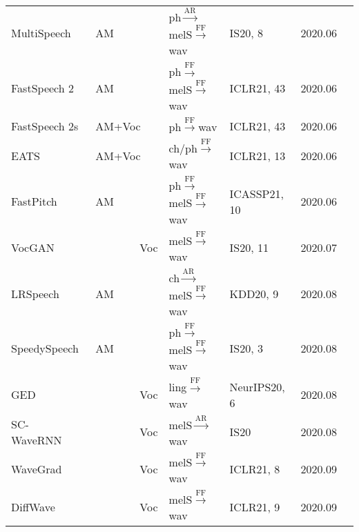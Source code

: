 \documentclass{article}
\begin{document}
\begin{center}
\begin{longtable}{l | l | l | l | l | l }
		MultiSpeech~\cite{chen2020multispeech}         & AM & {\color{blue}ph}$\stackrel{\text{AR}}{\longrightarrow}${\color{red}melS}$\stackrel{\text{FF}}{\longrightarrow}$wav              & IS20, 8 & 2020.06        \\
		FastSpeech 2~\cite{ren2021fastspeech}         & AM & {\color{blue}ph}$\stackrel{\text{FF}}{\longrightarrow}${\color{red}melS}$\stackrel{\text{FF}}{\longrightarrow}$wav              & ICLR21, 43 & 2020.06        \\
		FastSpeech 2s~\cite{ren2021fastspeech}  & AM+Voc &{\color{blue}ph}$\stackrel{\text{FF}}{\longrightarrow}$wav   & ICLR21, 43 & 2020.06         \\
		EATS~\cite{donahue2020end}  & AM+Voc & {\color{blue}ch/ph}$\stackrel{\text{FF}}{\longrightarrow}$wav   & ICLR21, 13 & 2020.06  \\
		FastPitch~\cite{lancucki2020fastpitch}   & AM & {\color{blue}ph}$\stackrel{\text{FF}}{\longrightarrow}${\color{red}melS}$\stackrel{\text{FF}}{\longrightarrow}$wav               &  ICASSP21, 10 & 2020.06        \\
		VocGAN~\cite{yang2020vocgan}                 & ~~~~~~~~Voc      & {\color{red}melS}$\stackrel{\text{FF}}{\longrightarrow}$wav          &IS20, 11& 2020.07         \\
		LRSpeech~\cite{xu2020lrspeech}           & AM       &  {\color{blue}ch}$\stackrel{\text{AR}}{\longrightarrow}${\color{red}melS}$\stackrel{\text{FF}}{\longrightarrow}$wav             &KDD20, 9& 2020.08         \\
		SpeedySpeech~\cite{vainer2020speedyspeech}           & AM       &  {\color{blue}ph}$\stackrel{\text{FF}}{\longrightarrow}${\color{red}melS}$\stackrel{\text{FF}}{\longrightarrow}$wav             &IS20, 3& 2020.08         \\
		GED~\cite{gritsenko2020spectral}               & ~~~~~~~~Voc      & {\color{green}ling}$\stackrel{\text{FF}}{\longrightarrow}$wav          & NeurIPS20, 6& 2020.08         \\
		SC-WaveRNN~\cite{paul2020speaker} &  ~~~~~~~~Voc  & {\color{red}melS}$\stackrel{\text{AR}}{\longrightarrow}$wav  & IS20 & 2020.08 \\
		WaveGrad~\cite{chen2020wavegrad}               & ~~~~~~~~Voc      & {\color{red}melS}$\stackrel{\text{FF}}{\longrightarrow}$wav          & ICLR21, 8& 2020.09         \\
		DiffWave~\cite{kong2020diffwave}               & ~~~~~~~~Voc      & {\color{red}melS}$\stackrel{\text{FF}}{\longrightarrow}$wav          & ICLR21, 9& 2020.09         \\

\end{longtable}
\end{center}
\end{document}
